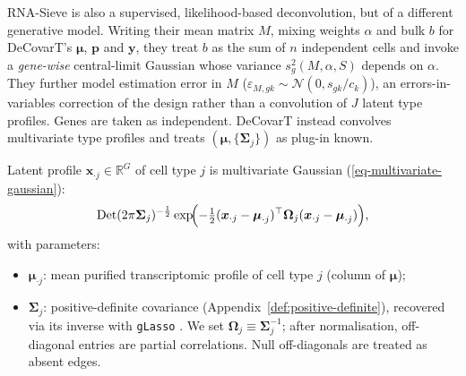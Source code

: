 \documentclass[pdflatex, sn-nature]{sn-jnl}
\theoremstyle{thmstyleone}%
\theoremstyle{thmstyletwo}%
\theoremstyle{thmstylethree}%
\begin{document}
    RNA-Sieve \cite{erdmann-phamLikelihoodbasedDeconvolutionBulk2021} is
    also a supervised, likelihood-based deconvolution, but of a different
    generative model. Writing their mean matrix $M$, mixing weights
    $\alpha$ and bulk $b$ for DeCovarT's $\boldsymbol{\mu}$,
    $\boldsymbol{p}$ and $\boldsymbol{y}$, they treat $b$ as the sum of
    $n$ independent cells and invoke a \emph{gene-wise} central-limit
    Gaussian whose variance $s_{g}^{2}(M,\alpha,S)$ depends on $\alpha$.
    They further model estimation error in $M$
    ($\varepsilon_{M,gk}\sim\mathcal{N}(0,s_{gk}/c_{k})$), an
    errors-in-variables correction of the design rather than a convolution
    of $J$ latent type profiles. Genes are taken as independent.
    DeCovarT instead convolves multivariate type profiles and treats
    $(\boldsymbol{\mu},\{\boldsymbol{\Sigma}_{j}\})$ as plug-in known.

    Latent profile $\boldsymbol{x}_{\cdot j}\in\mathbb{R}^{G}$ of cell type
    $j$ is multivariate Gaussian (\ref{eq-multivariate-gaussian}):
    \begin{equation}
        \label{eq-multivariate-gaussian}
        \operatorname*{Det}(2\pi\boldsymbol{\Sigma}_{j})^{-\frac{1}{2}}
        \exp\!\Bigl(
        -\tfrac{1}{2}
        (\boldsymbol{x}_{\cdot j}-\boldsymbol{\mu}_{\cdot j})^{\top}
        \boldsymbol{\Omega}_{j}
        (\boldsymbol{x}_{\cdot j}-\boldsymbol{\mu}_{\cdot j})
        \Bigr),
    \end{equation}
    with parameters:
    \begin{itemize}
        \item $\boldsymbol{\mu}_{\cdot j}$: mean purified transcriptomic
            profile of cell type $j$ (column of $\boldsymbol{\mu}$);

        \item $\boldsymbol{\Sigma}_{j}$: positive-definite covariance
            (Appendix~\ref{def:positive-definite}), recovered via its inverse
            with \texttt{gLasso}
            \cite{mazumderGraphicalLassoNew2011}. We set
            $\boldsymbol{\Omega}_{j}\equiv\boldsymbol{\Sigma}_{j}^{-1}$;
            after normalisation, off-diagonal entries are partial
            correlations. Null off-diagonals are treated as absent edges.
    \end{itemize}
\end{document}
